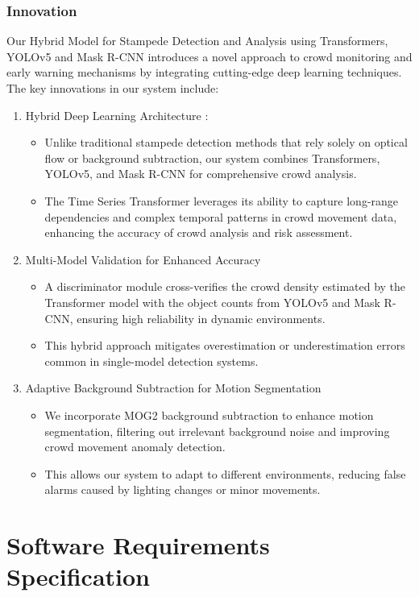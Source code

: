 \documentclass[11pt]{report}
\begin{document}
\subsection{Innovation}
Our Hybrid Model for Stampede Detection and Analysis using Transformers, YOLOv5 and Mask R-CNN introduces a novel approach to crowd monitoring and early warning mechanisms by integrating cutting-edge deep learning techniques. The key innovations in our system include:
\begin{enumerate}
    \item Hybrid Deep Learning Architecture :
    \begin{itemize}
        \item Unlike traditional stampede detection methods that rely solely on optical flow or background subtraction, our system combines Transformers, YOLOv5, and Mask R-CNN for comprehensive crowd analysis.
        \item The Time Series Transformer leverages its ability to capture long-range dependencies and complex temporal patterns in crowd movement data, enhancing the accuracy of crowd analysis and risk assessment.
    \end{itemize}

\item Multi-Model Validation for Enhanced Accuracy
\begin{itemize}
    \item A discriminator module cross-verifies the crowd density estimated by the Transformer model with the object counts from YOLOv5 and Mask R-CNN, ensuring high reliability in dynamic environments.
    \item This hybrid approach mitigates overestimation or underestimation errors common in single-model detection systems.
\end{itemize}
\item Adaptive Background Subtraction for Motion Segmentation 
\begin{itemize}
    \item We incorporate MOG2 background subtraction to enhance motion segmentation, filtering out irrelevant background noise and improving crowd movement anomaly detection.
    \item This allows our system to adapt to different environments, reducing false alarms caused by lighting changes or minor movements.
\end{itemize}
\end{enumerate}


\chapter {Software Requirements Specification}
\end{document}
